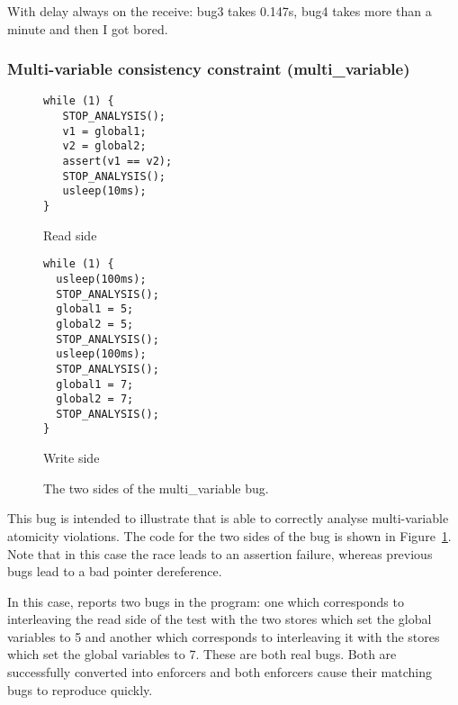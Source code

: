 With delay always on the receive: bug3 takes 0.147s, bug4 takes more
than a minute and then I got bored.



\subsubsection{Multi-variable consistency constraint (multi\_variable)}


\begin{figure}
  \begin{minipage}{70mm}
\begin{verbatim}
while (1) {
   STOP_ANALYSIS();
   v1 = global1;
   v2 = global2;
   assert(v1 == v2);
   STOP_ANALYSIS();
   usleep(10ms);
}
\end{verbatim}  
    \caption{Read side}
  \end{minipage}
  \begin{minipage}{70mm}
\begin{verbatim}
while (1) {
  usleep(100ms);
  STOP_ANALYSIS();
  global1 = 5;
  global2 = 5;
  STOP_ANALYSIS();
  usleep(100ms);
  STOP_ANALYSIS();
  global1 = 7;
  global2 = 7;
  STOP_ANALYSIS();
}
\end{verbatim}
    \caption{Write side}
  \end{minipage}
  \caption{The two sides of the multi\_variable bug.}
  \label{fig:eval:multi_variable}
\end{figure}

This bug is intended to illustrate that {\technique} is able to
correctly analyse multi-variable atomicity violations.  The code for
the two sides of the bug is shown in
Figure~\ref{fig:eval:multi_variable}.  Note that in this case the race
leads to an assertion failure, whereas previous bugs lead to a bad
pointer dereference.

In this case, {\technique} reports two bugs in the program: one which
corresponds to interleaving the read side of the test with the two
stores which set the global variables to 5 and another which
corresponds to interleaving it with the stores which set the global
variables to 7.  These are both real bugs.  Both are successfully
converted into enforcers and both enforcers cause their matching bugs
to reproduce quickly.

